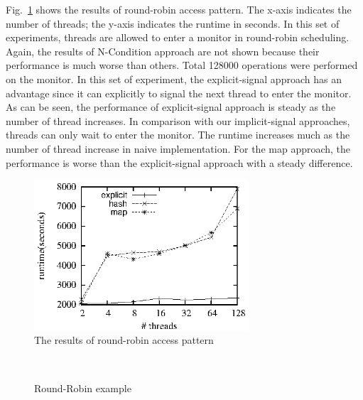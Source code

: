 \documentclass[preprint]{sigplanconf}
\begin{document}
%
Fig.~\ref{fig:rr_eval} shows the results of round-robin access pattern. The
x-axis indicates the number of threads; the y-axis indicates the
runtime in seconds. In this set of experiments, threads are allowed to enter a
monitor in round-robin scheduling. Again, the results of N-Condition approach
are not shown because their performance is much worse than others. Total 
128000 operations were performed on the monitor. In this set
of experiment, the explicit-signal approach has an advantage since it can
explicitly to signal the next thread to enter the monitor. As can be seen, the
performance of explicit-signal approach is steady as the number of thread
increases. In comparison with our implicit-signal approaches, threads can only 
wait to enter the monitor. The runtime increases much as the number of thread 
increase in naive implementation. For the map approach, the performance is 
worse than the explicit-signal approach with a steady difference. 

\begin{figure}[ht!]
  \centering
  \includegraphics[width=80mm]{fig/rr.eps}
  \caption{The results of round-robin access pattern}
  \label{fig:rr_eval}
\end{figure}
\begin{figure}
  \centering
  \\
  \caption{Round-Robin example}
  \label{fig:rbb_exp}
\end{figure}
\end{document}
